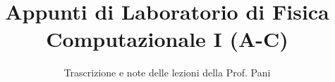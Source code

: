 \documentclass[a4paper,12pt]{article}
\title{Appunti di Laboratorio di Fisica Computazionale I (A-C)}
\author{Trascrizione e note delle lezioni della Prof. Pani}
\date{}
\begin{document}
\maketitle
\projectintro
\tableofcontents
\newpage

\end{document}

